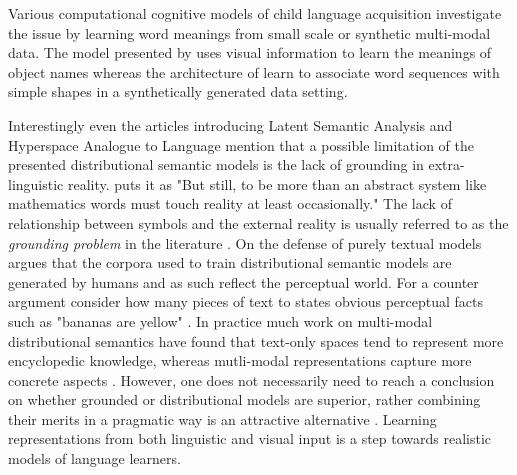 Various computational cognitive models of child language acquisition investigate the issue
by learning word meanings from small scale or synthetic multi-modal data. The model presented by
\cite{yu2005emergence} uses visual information to learn the meanings of object
names whereas the architecture of \cite{roy2002learning} learn to associate word sequences
with simple shapes in a synthetically generated data setting.

Interestingly even the articles introducing Latent Semantic Analysis
\citep{landauer1997solution} and Hyperspace Analogue to Language \citep{lund1996producing} mention
that a possible limitation of the presented distributional semantic models is the lack of
grounding in extra-linguistic reality. \cite{landauer1997solution} puts it as "But still, to be more than
an abstract system like mathematics words must touch reality at least occasionally."
The lack of relationship between symbols and the external reality is usually referred
to as the \emph{grounding problem} in the literature \citep{harnad1990symbol,perfetti1998limits}.
On the defense of purely textual models \cite{louwerse2011symbol} argues that the corpora
used to train distributional semantic models are generated by humans and as such reflect the perceptual world.
For a counter argument consider how many pieces of text to states obvious perceptual
facts such as "bananas are yellow" \citep{bruni2014multimodal}.
In practice much work on multi-modal distributional semantics have found that text-only spaces tend to
represent more encyclopedic knowledge, whereas mutli-modal representations capture more concrete aspects
\citep{andrews2009integrating,baroni2008concepts}. However, one does not necessarily need to
reach a conclusion on whether grounded or distributional models are superior, rather combining their merits in a
pragmatic way is an attractive alternative \citep{riordan2011redundancy}. Learning representations
from both linguistic and visual input is a step towards realistic models of language learners.

